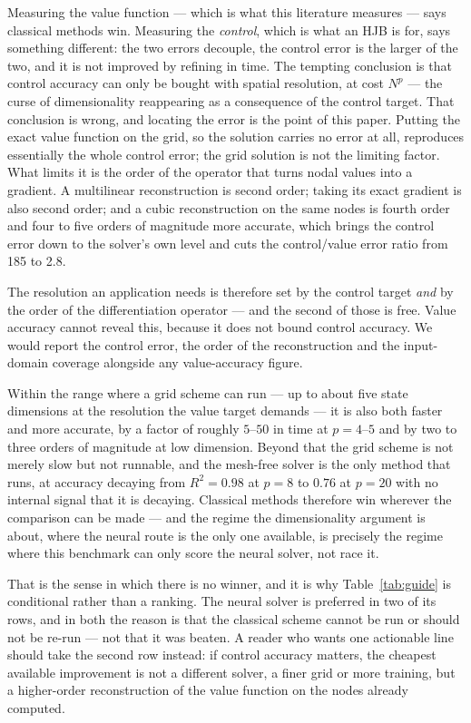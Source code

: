 \documentclass[conference]{IEEEtran}
\begin{document}
Measuring the value function --- which is what this literature measures --- says classical methods
win. Measuring the \emph{control}, which is what an HJB is for,
says something different: the two errors decouple, the control error is the larger of the two, and
it is not improved by refining in time. The tempting conclusion is that control accuracy can only
be bought with spatial resolution, at cost $N^p$ --- the curse of dimensionality reappearing as a
consequence of the control target. That conclusion is wrong, and locating the error is the point of
this paper. Putting the exact value function on the grid, so the solution carries no error at all,
reproduces essentially the whole control error; the grid solution is not the limiting factor. What
limits it is the order of the operator that turns nodal values into a gradient. A multilinear
reconstruction is second order; taking its exact gradient is also second order; and a cubic
reconstruction on the same nodes is fourth order and four to five orders of magnitude more
accurate, which brings the control error down to the solver's own level and cuts the control/value
error ratio from 185 to 2.8.

The resolution an application needs is therefore set by the control target \emph{and} by the order of the
differentiation operator --- and the second of those is free. Value accuracy cannot reveal this,
because it does not bound control accuracy. We would report the control error, the order of the
reconstruction and the input-domain coverage alongside any value-accuracy figure.

Within the range where a grid scheme can run --- up to about five state dimensions at the
resolution the value target demands --- it is also both faster and more accurate, by a factor of
roughly $5$--$50$ in time at $p=4$--$5$ and by two to three orders of magnitude at low dimension.
Beyond that the grid scheme is not merely slow but not runnable, and the mesh-free solver is the only
method that runs, at accuracy decaying from $R^2 = 0.98$ at $p=8$ to $0.76$ at $p=20$ with no
internal signal that it is decaying. Classical methods therefore win wherever the comparison can be
made --- and the regime the dimensionality argument is about, where the neural route is the only
one available, is precisely the regime where this benchmark can only score the neural solver, not
race it.

That is the sense in which there is no winner, and it is why
Table~\ref{tab:guide} is conditional rather than a ranking. The neural solver is preferred in two
of its rows, and in both the reason is that the classical scheme cannot be run or should not be
re-run --- not that it was beaten. A reader who wants one actionable line should take the second
row instead: if control accuracy matters, the cheapest available improvement is not a different
solver, a finer grid or more training, but a higher-order reconstruction of the value function on
the nodes already computed.
\end{document}
